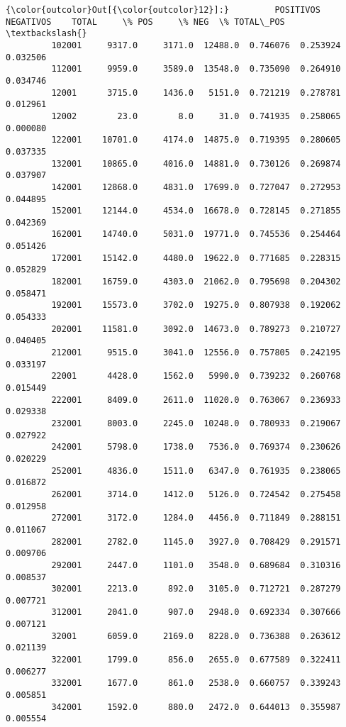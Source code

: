 \documentclass[11pt]{article}
\begin{document}
\begin{Verbatim}[commandchars=\\\{\}]
{\color{outcolor}Out[{\color{outcolor}12}]:}         POSITIVOS  NEGATIVOS    TOTAL     \% POS     \% NEG  \% TOTAL\_POS  \textbackslash{}
         102001     9317.0     3171.0  12488.0  0.746076  0.253924     0.032506   
         112001     9959.0     3589.0  13548.0  0.735090  0.264910     0.034746   
         12001      3715.0     1436.0   5151.0  0.721219  0.278781     0.012961   
         12002        23.0        8.0     31.0  0.741935  0.258065     0.000080   
         122001    10701.0     4174.0  14875.0  0.719395  0.280605     0.037335   
         132001    10865.0     4016.0  14881.0  0.730126  0.269874     0.037907   
         142001    12868.0     4831.0  17699.0  0.727047  0.272953     0.044895   
         152001    12144.0     4534.0  16678.0  0.728145  0.271855     0.042369   
         162001    14740.0     5031.0  19771.0  0.745536  0.254464     0.051426   
         172001    15142.0     4480.0  19622.0  0.771685  0.228315     0.052829   
         182001    16759.0     4303.0  21062.0  0.795698  0.204302     0.058471   
         192001    15573.0     3702.0  19275.0  0.807938  0.192062     0.054333   
         202001    11581.0     3092.0  14673.0  0.789273  0.210727     0.040405   
         212001     9515.0     3041.0  12556.0  0.757805  0.242195     0.033197   
         22001      4428.0     1562.0   5990.0  0.739232  0.260768     0.015449   
         222001     8409.0     2611.0  11020.0  0.763067  0.236933     0.029338   
         232001     8003.0     2245.0  10248.0  0.780933  0.219067     0.027922   
         242001     5798.0     1738.0   7536.0  0.769374  0.230626     0.020229   
         252001     4836.0     1511.0   6347.0  0.761935  0.238065     0.016872   
         262001     3714.0     1412.0   5126.0  0.724542  0.275458     0.012958   
         272001     3172.0     1284.0   4456.0  0.711849  0.288151     0.011067   
         282001     2782.0     1145.0   3927.0  0.708429  0.291571     0.009706   
         292001     2447.0     1101.0   3548.0  0.689684  0.310316     0.008537   
         302001     2213.0      892.0   3105.0  0.712721  0.287279     0.007721   
         312001     2041.0      907.0   2948.0  0.692334  0.307666     0.007121   
         32001      6059.0     2169.0   8228.0  0.736388  0.263612     0.021139   
         322001     1799.0      856.0   2655.0  0.677589  0.322411     0.006277   
         332001     1677.0      861.0   2538.0  0.660757  0.339243     0.005851   
         342001     1592.0      880.0   2472.0  0.644013  0.355987     0.005554   

\end{Verbatim}
\end{document}
